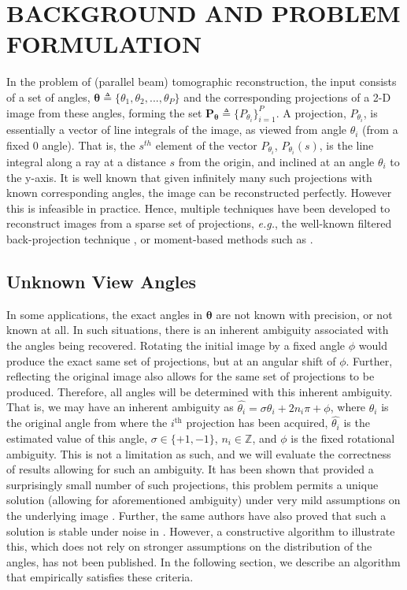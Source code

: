 \documentclass{article}
\begin{document}
\section{BACKGROUND AND PROBLEM FORMULATION}
\label{sec:problem}
In the problem of (parallel beam) tomographic reconstruction, the input consists of a set of angles, $\bm\theta \triangleq \{ \theta_1, \theta_2, ..., \theta_P \}$ and the corresponding projections of a 2-D image from these angles, forming the set  $\bm{P_\theta} \triangleq \{ P_{\theta_i} \}_{i=1}^P$. A projection, $P_{\theta_i}$, is essentially a vector of line integrals of the image, as viewed from angle $\theta_i$ (from a fixed $0$ angle). That is, the $s^{th}$ element of the vector $P_{\theta_i}$, $P_{\theta_i}(s)$, is the line integral along a ray at a distance $s$ from the origin, and inclined at an angle $\theta_i$ to the y-axis. It is well known that given infinitely many such projections with known corresponding angles, the image can be reconstructed perfectly. However this is infeasible in practice. Hence, multiple techniques have been developed to reconstruct images from a sparse set of projections, \textit{e.g.}, the well-known filtered back-projection technique \cite{dipbook}, or moment-based methods such as \cite{imagemomentmethod}.

\subsection{Unknown View Angles}
In some applications, the exact angles in $\bm \theta$ are not known with precision, or not known at all. In such situations, there is an inherent ambiguity associated with the angles being recovered. Rotating the initial image by a fixed angle $\phi$ would produce the exact same set of projections, but at an angular shift of $\phi$. Further, reflecting the original image also allows for the same set of projections to be produced. Therefore, all angles will be determined with this inherent ambiguity. That is, we may have an inherent ambiguity as
$\hat{\theta_i} = \sigma\theta_i + 2n_i\pi + \phi$, where $\theta_i$ is the original angle from where the $i^\textrm{th}$ projection has been acquired, $\hat{\theta_i}$ is the estimated value of this angle, $\sigma \in \{+1,-1\}$, $n_i \in \mathbb{Z}$, and $\phi$ is the fixed rotational ambiguity. This is not a limitation as such, and we will evaluate the correctness of results allowing for such an ambiguity. It has been shown that provided a surprisingly small number of such projections, this problem permits a unique solution (allowing for aforementioned ambiguity) under very mild assumptions on the underlying image \cite{uniqueness}. Further, the same authors have also proved that such a solution is stable under noise in \cite{feasibility}. However, a constructive algorithm to illustrate this, which does not rely on stronger assumptions on the distribution of the angles, has not been published. In the following section, we describe an algorithm that empirically satisfies these criteria.
\end{document}

